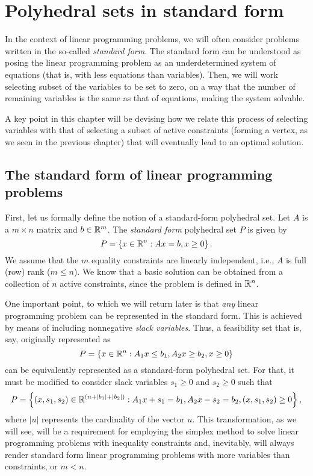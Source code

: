 \section{Polyhedral sets in standard form}

In the context of linear programming problems, we will often consider problems written in the so-called \emph{standard form}. The standard form can be understood as posing the linear programming problem as an underdetermined system of equations (that is, with less equations than variables). Then, we will work selecting subset of the variables to be set to zero, on a way that the number of remaining variables is the same as that of equations, making the system solvable. 

A key point in this chapter will be devising how we relate this process of selecting variables with that of selecting a subset of active constraints (forming a vertex, as we seen in the previous chapter) that will eventually lead to an optimal solution. 


\subsection{The standard form of linear programming problems}

First, let us formally define the notion of a standard-form polyhedral set. Let $A$ is a $m \times n$ matrix and $b \in \mathbb{R}^m$. The \emph{standard form} polyhedral set $P$ is given by 
%
\begin{equation*}
	P = \left\{ x \in \mathbb{R}^n : Ax = b, x \geq 0 \right \}.		
\end{equation*}
%
We assume that the $m$ equality constraints are linearly independent, i.e., $A$ is full (row) rank ($m \leq n$). We know that a basic solution can be obtained from a collection of $n$ active constraints, since the problem is defined in $\mathbb{R}^n$. 

One important point, to which we will return later is that \emph{any} linear programming problem can be represented in the standard form. This is achieved by means of including nonnegative \emph{slack variables}. Thus, a feasibility set that is, say, originally represented as
%
\begin{equation*}
	P = \left\{ x \in \mathbb{R}^n : A_1 x \le b_1, A_2x \ge b_2, x \ge 0 \right \}
\end{equation*}
%
can be equivalently represented as a standard-form polyhedral set. For that, it must be modified to consider slack variables $s_1 \ge 0$ and $s_2 \geq 0$ such that
%
\begin{equation*}
	P = \left\{ (x, s_1, s_2) \in \mathbb{R}^{(n + |b_1| + |b_2|)} : A_1 x + s_1 = b_1, A_2x - s_2 = b_2, (x, s_1, s_2) \ge 0 \right \},
\end{equation*}
%
where $|u|$ represents the cardinality of the vector $u$. This transformation, as we will see, will be a requirement for employing the simplex method to solve linear programming problems with inequality constraints and, inevitably, will always render standard form linear programming problems with more variables than constraints, or $m < n$.

